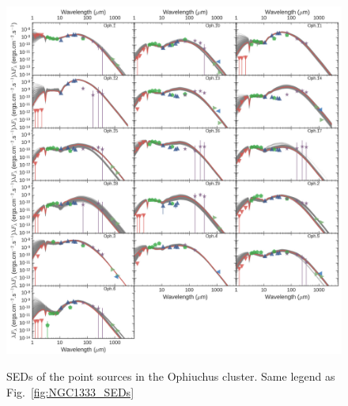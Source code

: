 \begin{figure}
\begin{center}
\includegraphics[width=\textwidth]{Figures/Oph_SEDs.jpg}
\label{fig:Oph_SEDs}
\caption[Ophiuchus SEDs]{SEDs of the point sources in the Ophiuchus cluster. Same legend as Fig.~\ref{fig:NGC1333_SEDs}}
\end{center}
\end{figure}

